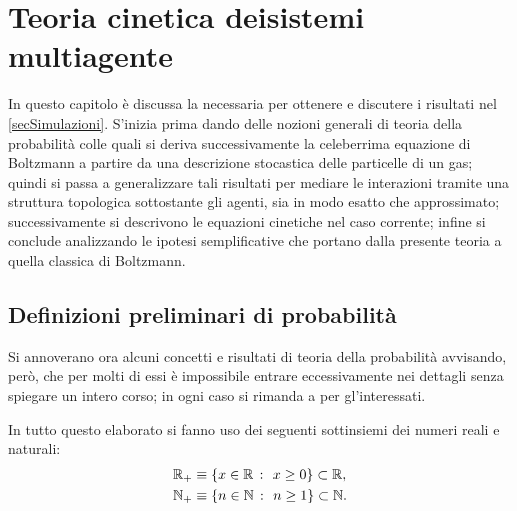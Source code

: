 

\chapter[Teoria cinetica dei sistemi multiagente]{\texorpdfstring
    {Teoria cinetica dei\newline sistemi multiagente}
    {Teoria cinetica dei sistemi multiagente}%
}\label{secTCSM}

    In questo capitolo è discussa la \TCSMA{} necessaria per ottenere e discutere i risultati nel \cref{secSimulazioni}. S'inizia prima dando delle nozioni generali di teoria della probabilità colle quali si deriva successivamente la celeberrima equazione di Boltzmann a partire da una descrizione stocastica delle particelle di un gas; quindi si passa a generalizzare tali risultati per mediare le interazioni tramite una struttura topologica sottostante gli agenti, sia in modo esatto che approssimato; successivamente si descrivono le equazioni cinetiche nel caso corrente; infine si conclude analizzando le ipotesi semplificative che portano dalla presente teoria a quella classica di Boltzmann.
                

    \section{Definizioni preliminari di probabilità}\label{secDefinizioniPreliminariProbabilitàTCSMA}

        Si annoverano ora alcuni concetti e risultati di teoria della probabilità avvisando, però, che per molti di essi è impossibile entrare eccessivamente nei dettagli senza spiegare un intero corso; in ogni caso si rimanda a \cite{Durrett2019PTE} per gl'interessati.

        \begin{dfn}
            In tutto questo elaborato si fanno uso dei seguenti sottinsiemi dei numeri reali e naturali:
            \begin{equation*} %
                \begin{aligned}
                    \RPlus&\equiv\{x\in\mathbb R\ \colon\ x\ge0\}\subset\mathbb R,\\
                    \NPlus&\equiv\{n\in\mathbb N\ \colon\ n\geq1\}\subset\mathbb N.
                \end{aligned}
            \end{equation*}
        \end{dfn}

